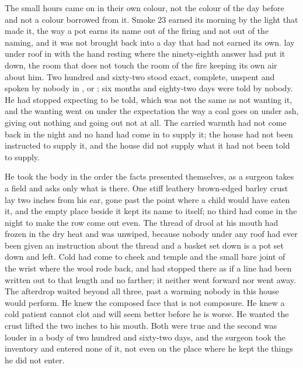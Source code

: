 
The small hours came on in their own colour, not the colour of the day before and not a colour borrowed from it. Smoke 23 earned its morning by the light that made it, the way a pot earns its name out of the firing and not out of the naming, and it was not brought back into a day that had not earned its own.  lay under  roof in  with the hand resting where the ninety-eighth answer had put it down, the room that does not touch the room of the fire keeping its own air about him. Two hundred and sixty-two stood exact, complete, unspent and spoken by nobody in ,  or ; six months and eighty-two days were told by nobody. He had stopped expecting to be told, which was not the same as not wanting it, and the wanting went on under the expectation the way a coal goes on under ash, giving out nothing and going out not at all. The carried warmth had not come back in the night and no hand had come in to supply it; the house had not been instructed to supply it, and the house did not supply what it had not been told to supply.

He took the body in the order the facts presented themselves, as a surgeon takes a field and asks only what is there. One stiff leathery brown-edged barley crust lay two inches from his ear, gone past the point where a child would have eaten it, and the empty place beside it kept its name to itself; no third had come in the night to make the row come out even. The thread of drool at his mouth had frozen in the dry heat and was unwiped, because nobody under any roof had ever been given an instruction about the thread and a basket set down is a pot set down and left. Cold had come to cheek and temple and the small bare joint of the wrist where the wool rode back, and had stopped there as if a line had been written out to that length and no farther; it neither went forward nor went away. The afterdrop waited beyond all three, past a warming nobody in this house would perform. He knew the composed face that is not composure. He knew a cold patient cannot clot and will seem better before he is worse. He wanted the crust lifted the two inches to his mouth. Both were true and the second was louder in a body of two hundred and sixty-two days, and the surgeon took the inventory and entered none of it, not even on the place where he kept the things he did not enter.

